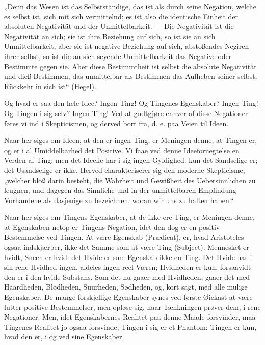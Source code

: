 \documentclass[12pt]{book}
\newcommand{\opage}[1]{\marginnote{\footnotesize\textit{[#1]}}}
\begin{document}
„Denn das Wesen ist das Selbstständige, das ist als durch seine Negation, welche es selbst ist,
sich mit sich vermittelnd; es ist also die identische Einheit der absoluten Negativität und der
Unmittelbarkeit. — Die Negativität ist
\opage{154} die Negativität an sich; sie ist ihre Beziehung auf sich, so ist sie an sich Unmittelbarkeit; aber
sie ist negative Beziehung auf sich, abstoßendes Negiren ihrer selbst, so ist die an sich seyende
Unmittelbarkeit das Negative oder Bestimmte gegen sie. Aber diese Bestimmtheit ist selbst die
absolute Negativität und dieß Bestimmen, das unmittelbar als Bestimmen das Aufheben seiner selbst,
Rückkehr in sich ist“ (Hegel).

Og hvad er saa den hele Idee? Ingen Ting! Og Tingenes Egenskaber? Ingen Ting! Og Tingen i sig
selv? Ingen Ting! Ved at godtgjøre enhver af disse Negationer føres vi ind i Skepticismen, og
derved bort fra, d. e. paa Veien til Ideen.

Naar her siges om Ideen, at den er ingen Ting, er Meningen denne, at Tingen er, og er i al
Umiddelbarhed det Positive. Vi faae ved denne Ideefornegtelse en Verden af Ting; men det Ideelle
har i sig ingen Gyldighed: kun det Sandselige er; det Usandselige er ikke. Herved charakteriserer
sig den moderne Skepticisme, „welcher bloß darin besteht, die Wahrheit und Gewißheit des
Uebersinnlichen zu leugnen, und dagegen das Sinnliche und in der unmittelbaren Empfindung
Vorhandene als dasjenige zu bezeichnen, woran wir uns zu halten haben.“

Naar her siges om Tingens Egenskaber, at de ikke ere Ting, er Meningen denne, at Egenskaben netop
er Tingens Negation, idet den dog er en positiv Bestemmelse ved Tingen. At være Egenskab
(Prædicat), er, hvad Aristoteles ogsaa indskjærper, ikke det Samme som at være Ting (Subject).
Mennesket er hvidt, Sneen er hvid: det Hvide er som Egenskab ikke en Ting. Det Hvide har i sin
rene Hvidhed ingen, aldeles ingen reel Væren; Hvidheden er kun, forsaavidt den er i den hvide
Substans. Som det nu gaaer med Hvidheden, gaaer det med Haardheden, Blødheden, Suurheden,
Sødheden, og, kort sagt, med alle mulige Egenskaber. De mange forskjellige Egenskaber synes ved
første Øiekast at være lutter positive Bestemmelser, men opløse sig, naar
\opage{155} Tænkningen prøver dem, i rene Negationer. Men, idet Egenskabernes Realitet paa denne Maade
forsvinder, maa Tingenes Realitet jo ogsaa forsvinde; Tingen i sig er et Phantom: Tingen er kun,
hvad den er, i og ved sine Egenskaber.
\end{document}
